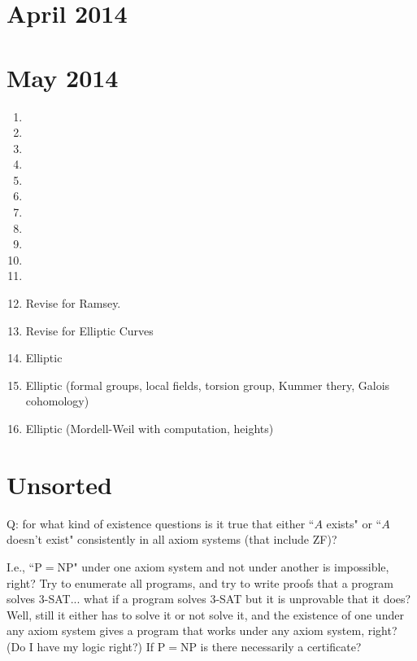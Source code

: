 \section{April 2014}

\section{May 2014}
\begin{enumerate}
\item
\item
\item
\item
\item
\item
\item
\item
\item
\item
\item
\item %
Revise for Ramsey.
\item Revise for Elliptic Curves
\item Elliptic
\item Elliptic (formal groups, local fields, torsion group, Kummer thery, Galois cohomology)
\item Elliptic (Mordell-Weil with computation, heights)
\end{enumerate}

%









\section{Unsorted}


Q: for what kind of existence questions is it true that either ``$A$ exists" or ``$A$ doesn't exist" consistently in all axiom systems (that include ZF)? 

I.e., ``P$=$NP" under one axiom system and not under another is impossible, right? Try to enumerate all programs, and try to write proofs that a program solves 3-SAT... what if a program solves 3-SAT but it is unprovable that it does? Well, still it either has to solve it or not solve it, and the existence of one under any axiom system gives a program that works under any axiom system, right? (Do I have my logic right?) If P$=$NP is there necessarily a certificate?

